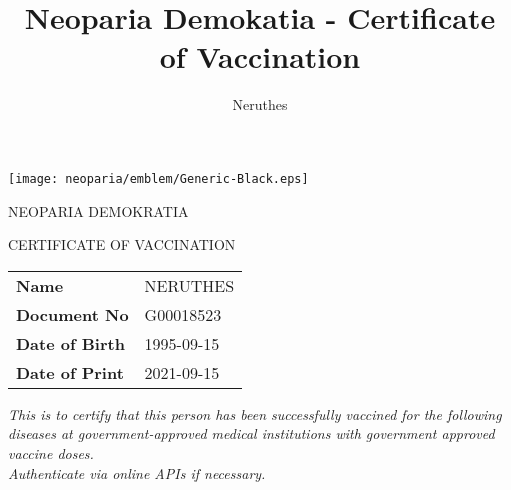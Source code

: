 \documentclass[b6paper,10pt]{article}
\title{Neoparia Demokatia - Certificate of Vaccination}
\author{Neruthes}
\date{}
\begin{document}
    \pagestyle{empty}
    \pagecolor{SoftYellow}
    \setlength{\tabulinesep}{4pt}
    \setlength{\tabcolsep}{6pt}
    \setlength{\baselineskip}{10pt}


        \begin{minipage}[b][110mm][t]{77mm}
            \large
            \RaggedRight

            {\hfill{\texttt{[image: neoparia/emblem/Generic-Black.eps]}}\hfill}
            
            {\hfill{NEOPARIA DEMOKRATIA}\hfill}


            {\hfill{CERTIFICATE OF VACCINATION}\hfill}

            \vspace{5mm}

            \ttfamily
            \newcommand{\bearerinfotablerow}[2]{
                {\sffamily\bfseries\small{#1}} & {\hspace{12pt}\ttfamily\normalsize\color{Sepia}#2} \\
            }
            \tabcolsep=0pt
            \begin{tabu} {lX}
                \bearerinfotablerow{Name}{NERUTHES}
                \bearerinfotablerow{Document No}{G00018523}
                \bearerinfotablerow{Date of Birth}{1995-09-15}
                \bearerinfotablerow{Date of Print}{2021-09-15}
            \end{tabu}

            \vspace{5mm}

            {\rmfamily\itshape\small
                This is to certify that this person has been successfully vaccined for the following diseases
                    at government-approved medical institutions with government approved vaccine doses.\\
                Authenticate via online APIs if necessary.

}
\end{minipage}
\end{document}
